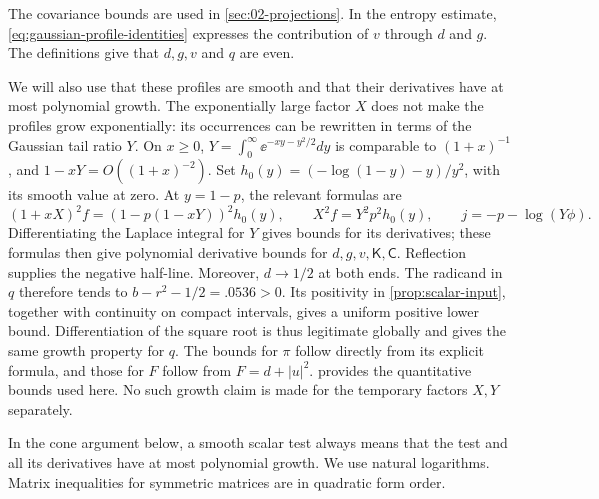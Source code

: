 The covariance bounds are used in \cref{sec:02-projections}. In the entropy estimate, \eqref{eq:gaussian-profile-identities} expresses the contribution of $v$ through $d$ and $g$. The definitions give that $d,g,v$ and $q$ are even.

We will also use that these profiles are smooth and that their derivatives have at most polynomial growth. The exponentially large factor $X$ does not make the profiles grow exponentially: its occurrences can be rewritten in terms of the Gaussian tail ratio $Y$. On $x\ge0$, $Y=\int_0^\infty \ee^{-xy-y^2/2}dy$ is comparable to $(1+x)^{-1}$, and $1-xY=O((1+x)^{-2})$. Set $h_0(y)=(-\log(1-y)-y)/y^2$, with its smooth value at zero. At $y=1-p$, the relevant formulas are
\[
 (1+xX)^2f=(1-p(1-xY))^2h_0(y),\qquad
 X^2f=Y^2p^2h_0(y),\qquad j=-p-\log(Y\phi).
\]
Differentiating the Laplace integral for $Y$ gives bounds for its derivatives; these formulas then give polynomial derivative bounds for $d,g,v,\mathsf K,\mathsf C$. Reflection supplies the negative half-line. Moreover, $d\to1/2$ at both ends. The radicand in $q$ therefore tends to $b-r^2-1/2=.0536>0$. Its positivity in \cref{prop:scalar-input}, together with continuity on compact intervals, gives a uniform positive lower bound. Differentiation of the square root is thus legitimate globally and gives the same growth property for $q$. The bounds for $\pi$ follow directly from its explicit formula, and those for $F$ follow from $F=d+|u|^2$.  provides the quantitative bounds used here. No such growth claim is made for the temporary factors $X,Y$ separately.

In the cone argument below, a smooth scalar test always means that the test and all its derivatives have at most polynomial growth. We use natural logarithms. Matrix inequalities for symmetric matrices are in quadratic form order.
